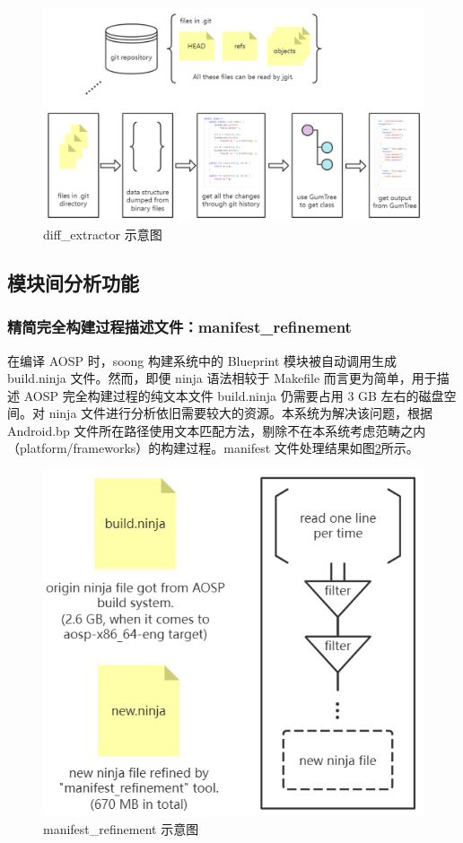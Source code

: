 \begin{figure}[htb]
    \centering
    \includegraphics[width=.9\textwidth]{figures/archi-diff-extractor.png}
    \caption{diff\_extractor 示意图}
    \label{fig:archi-diff-extractor}
\end{figure}

\subsection{模块间分析功能}

\subsubsection{精简完全构建过程描述文件：manifest\_refinement}

在编译 AOSP 时，soong 构建系统中的 Blueprint 模块被自动调用生成 build.ninja 文件。然而，即便 ninja 语法相较于 Makefile 而言更为简单，用于描述 AOSP 完全构建过程的纯文本文件 build.ninja 仍需要占用 3 GB 左右的磁盘空间。对 ninja 文件进行分析依旧需要较大的资源。本系统为解决该问题，根据 Android.bp 文件所在路径使用文本匹配方法，剔除不在本系统考虑范畴之内（platform/frameworks）的构建过程。manifest 文件处理结果如图\ref{fig:archi-manifest-refinement}所示。

\begin{figure}[htb]
    \centering
    \includegraphics[width=.5\textwidth]{figures/archi-manifest-refinement.png}
    \caption{manifest\_refinement 示意图}
    \label{fig:archi-manifest-refinement}
\end{figure}

